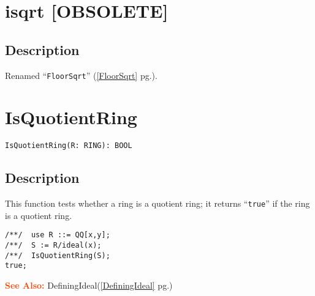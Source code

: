 \documentclass[a4paper]{mybook}
\newenvironment{command}{}{} %
\newcommand\SeeAlso{\par\textcolor{OrangeRed}{\textbf{\large See Also: }}}
\begin{document}
\section{isqrt [OBSOLETE]}
\label{isqrt [OBSOLETE]}
\begin{command} %



\subsection*{Description}

Renamed ``\verb&FloorSqrt&'' (\ref{FloorSqrt} pg.\pageref{FloorSqrt}).

\end{command} %

\section{IsQuotientRing}
\label{IsQuotientRing}
\begin{command} %


\begin{Verbatim}[label=syntax, rulecolor=\color{MidnightBlue},
frame=single]
IsQuotientRing(R: RING): BOOL
\end{Verbatim}


\subsection*{Description}

This function tests whether a ring is a quotient ring; it returns ``\verb&true&''
if the ring is a quotient ring.
\begin{Verbatim}[label=example, rulecolor=\color{PineGreen}, frame=single]
/**/  use R ::= QQ[x,y];
/**/  S := R/ideal(x);
/**/  IsQuotientRing(S);
true;
\end{Verbatim}


\SeeAlso %
  DefiningIdeal(\ref{DefiningIdeal} pg.\pageref{DefiningIdeal})
\end{command} %
\end{document}
